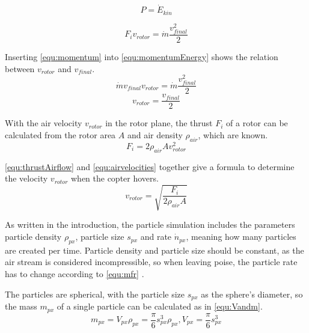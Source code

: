     \begin{equation}
    P = \dot E_{kin}
    \label{equ:consE}
    \end{equation}
    
    \begin{equation}
    F_i v_{rotor} = \dot m \frac{v_{final}^2}{2}
    \label{equ:momentumEnergy}
    \end{equation}
    
    Inserting \ref{equ:momentum} into \ref{equ:momentumEnergy} shows the relation between $v_{rotor}$ and $v_{final}$.
    \begin{equation}
    \dot m v_{final}  v_{rotor} = \dot m \frac{v_{final}^2}{2}
    \end{equation}
    \begin{equation}
     v_{rotor} = \frac{v_{final}}{2}
     \label{equ:airvelocities}
    \end{equation}
    
    With the air velocity $v_{rotor}$ in the rotor plane, the thrust $F_i$ of a rotor can be calculated from the rotor area $A$ and air density $\rho_{air}$, which are known.
    \begin{equation}
    F_i = 2 \rho_{air} A v_{rotor}^2
    \label{equ:thrustAirflow}
    \end{equation}
    
    \ref{equ:thrustAirflow} and \ref{equ:airvelocities} together give a formula to determine the  velocity $v_{rotor}$  when the copter hovers.
    \begin{equation}
    v_{rotor}= \sqrt{\frac{ F_i}{2 \rho_{air} A}}
    \end{equation}
    
    As written in the introduction, the particle simulation includes the parameters particle density $\rho_{px}$, particle size $s_{px}$ and rate $\dot n_{px}$, meaning how many particles are created per time. 
    Particle density and particle size should be constant, as the air stream is considered incompressible, so when leaving poise, the particle rate has to change according to \ref{equ:mfr} \cite{deeg2006modeling}.
    
    The particles are spherical, with the particle size $s_{px}$ as the sphere's diameter, so the mass $m_{px}$ of a single particle can be calculated as in \ref{equ:Vandm}.
    \begin{equation}
    m_{px} = V_{px}  \rho_{px}  =  \frac{\pi}{6}s_{px}^3  \rho_{px},  V_{px}  = \frac{\pi}{6}s_{px}^3
    \label{equ:Vandm}
    \end{equation}
    
